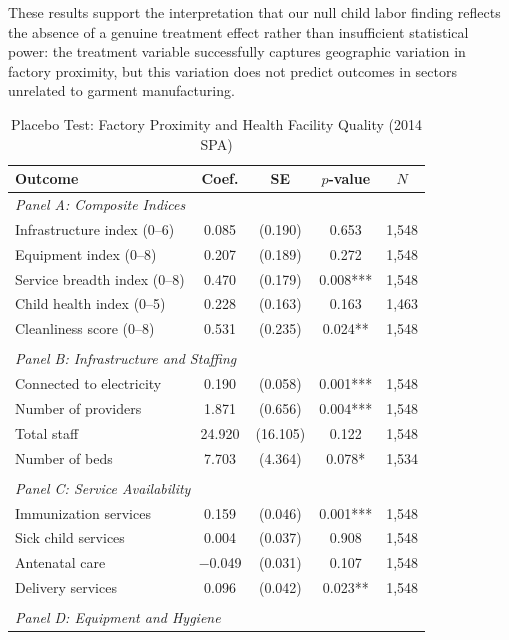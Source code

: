\documentclass[12pt]{article}
\begin{document}
These results support the interpretation that our null child labor finding reflects the absence of a genuine treatment effect rather than insufficient statistical power: the treatment variable successfully captures geographic variation in factory proximity, but this variation does not predict outcomes in sectors unrelated to garment manufacturing.

\begin{table}[H]
\centering
\caption{Placebo Test: Factory Proximity and Health Facility Quality (2014 SPA)}
\label{tab:spa_placebo}
\begin{threeparttable}
\begin{tabular}{lcccc}
\toprule
Outcome & Coef. & SE & $p$-value & $N$ \\
\midrule
\multicolumn{5}{l}{\textit{Panel A: Composite Indices}} \\
Infrastructure index (0--6) & 0.085 & (0.190) & 0.653 & 1,548 \\
Equipment index (0--8) & 0.207 & (0.189) & 0.272 & 1,548 \\
Service breadth index (0--8) & 0.470 & (0.179) & 0.008*** & 1,548 \\
Child health index (0--5) & 0.228 & (0.163) & 0.163 & 1,463 \\
Cleanliness score (0--8) & 0.531 & (0.235) & 0.024** & 1,548 \\
\\
\multicolumn{5}{l}{\textit{Panel B: Infrastructure and Staffing}} \\
Connected to electricity & 0.190 & (0.058) & 0.001*** & 1,548 \\
Number of providers & 1.871 & (0.656) & 0.004*** & 1,548 \\
Total staff & 24.920 & (16.105) & 0.122 & 1,548 \\
Number of beds & 7.703 & (4.364) & 0.078* & 1,534 \\
\\
\multicolumn{5}{l}{\textit{Panel C: Service Availability}} \\
Immunization services & 0.159 & (0.046) & 0.001*** & 1,548 \\
Sick child services & 0.004 & (0.037) & 0.908 & 1,548 \\
Antenatal care & $-$0.049 & (0.031) & 0.107 & 1,548 \\
Delivery services & 0.096 & (0.042) & 0.023** & 1,548 \\
\\
\multicolumn{5}{l}{\textit{Panel D: Equipment and Hygiene}} \\

\end{tabular}
\end{threeparttable}
\end{table}
\end{document}
